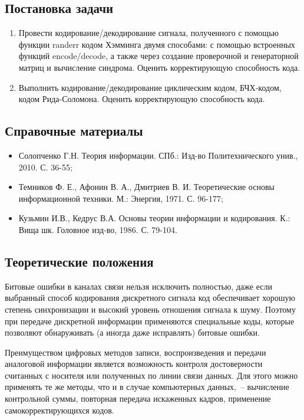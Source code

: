 \documentclass[12pt,a4paper]{article}
\begin{document}
\subsection{Постановка задачи}

	\begin{enumerate}
	  \item Провести кодирование/декодирование сигнала, полученного с помощью функции randerr кодом Хэмминга двумя способами: с помощью встроенных функций encode/decode, а также через создание проверочной и генераторной матриц и вычисление синдрома. Оценить корректирующую способность кода.
    \item Выполнить кодирование/декодирование циклическим кодом, БЧХ-кодом, кодом Рида-Соломона. Оценить корректирующую способность кода.
	\end{enumerate}
	
\subsection{Справочные материалы}
  \begin{itemize}
    \item Солопченко Г.Н. Теория информации. СПб.: Изд-во Политехнического унив., 2010. С. 36-55;
    \item Темников Ф. Е., Афонин В. А., Дмитриев В. И. Теоретические основы информационной техники. М.: Энергия, 1971. С. 96-177;
    \item Кузьмин И.В., Кедрус В.А. Основы теории информации и кодирования. К.: Вища шк. Головное изд-во, 1986. С. 79-104.
  \end{itemize}

\subsection{Теоретические положения}
  
  Битовые ошибки в каналах связи нельзя исключить полностью, даже если выбранный способ кодирования дискретного сигнала код обеспечивает хорошую степень синхронизации и высокий уровень отношения сигнала к шуму. Поэтому при передаче дискретной информации применяются специальные коды, которые позволяют обнаруживать (а иногда даже исправлять) битовые ошибки.
  
  Преимуществом цифровых методов записи, воспроизведения и передачи аналоговой информации является возможность контроля достоверности считанных с носителя или полученных по линии связи данных. Для этого можно применять те же методы, что и в случае компьютерных данных,~-- вычисление контрольной суммы, повторная передача искаженных кадров, применение самокорректирующихся кодов.
  
\end{document}
